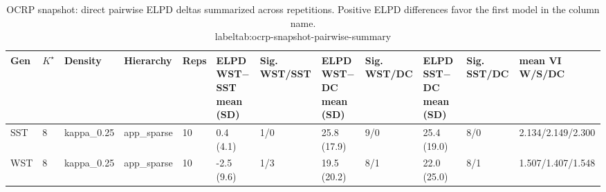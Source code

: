 \begin{table}[!h]
\centering
\caption{OCRP snapshot: direct pairwise ELPD deltas summarized across repetitions. Positive ELPD differences favor the first model in the column name.\\label{tab:ocrp-snapshot-pairwise-summary}}
\centering
\begin{tabular}[t]{llllllllllll}
\toprule
Gen & $K^\star$ & Density & Hierarchy & Reps & ELPD WST$-$SST mean (SD) & Sig. WST/SST & ELPD WST$-$DC mean (SD) & Sig. WST/DC & ELPD SST$-$DC mean (SD) & Sig. SST/DC & mean VI W/S/DC\\
\midrule
SST & 8 & kappa_0.25 & app_sparse & 10 & 0.4 (4.1) & 1/0 & 25.8 (17.9) & 9/0 & 25.4 (19.0) & 8/0 & 2.134/2.149/2.300\\
WST & 8 & kappa_0.25 & app_sparse & 10 & -2.5 (9.6) & 1/3 & 19.5 (20.2) & 8/1 & 22.0 (25.0) & 8/1 & 1.507/1.407/1.548\\
\bottomrule
\end{tabular}
\end{table}
